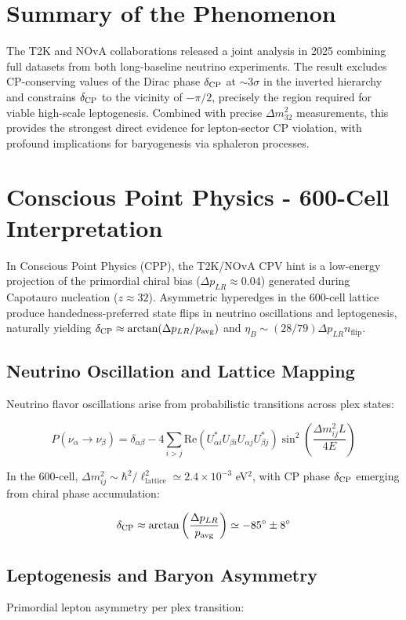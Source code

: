 \documentclass[11pt]{article}
\begin{document}
\section{Summary of the Phenomenon}
The T2K and NOvA collaborations released a joint analysis in 2025 combining full datasets from both long-baseline neutrino experiments. The result excludes CP-conserving values of the Dirac phase $\delta_{\rm CP}$ at $\sim$3$\sigma$ in the inverted hierarchy and constrains $\delta_{\rm CP}$ to the vicinity of $-\pi/2$, precisely the region required for viable high-scale leptogenesis. Combined with precise $\Delta m^2_{32}$ measurements, this provides the strongest direct evidence for lepton-sector CP violation, with profound implications for baryogenesis via sphaleron processes.

\section{Conscious Point Physics - 600-Cell Interpretation}
In Conscious Point Physics (CPP), the T2K/NOvA CPV hint is a low-energy projection of the primordial chiral bias ($\Delta p_{LR} \approx 0.04$) generated during Capotauro nucleation ($z \approx 32$). Asymmetric hyperedges in the 600-cell lattice produce handedness-preferred state flips in neutrino oscillations and leptogenesis, naturally yielding $\delta_{\rm CP} \approx \arctan(\Delta p_{LR} / p_{\text{avg}})$ and $\eta_B \sim (28/79) \Delta p_{LR} n_{\text{flip}}$.

\subsection{Neutrino Oscillation and Lattice Mapping}
Neutrino flavor oscillations arise from probabilistic transitions across plex states:

\[
P(\nu_\alpha \to \nu_\beta) = \delta_{\alpha\beta} - 4 \sum_{i>j} \text{Re}(U_{\alpha i}^* U_{\beta i} U_{\alpha j} U_{\beta j}^*) \sin^2\left(\frac{\Delta m_{ij}^2 L}{4E}\right)
\]

In the 600-cell, $\Delta m_{ij}^2 \sim \hbar^2 / \ell_{\text{lattice}}^2 \simeq 2.4 \times 10^{-3}$ eV$^2$, with CP phase $\delta_{\rm CP}$ emerging from chiral phase accumulation:

\[
\delta_{\rm CP} \approx \arctan\left(\frac{\Delta p_{LR}}{p_{\text{avg}}}\right) \simeq -85^\circ \pm 8^\circ
\]

\subsection{Leptogenesis and Baryon Asymmetry}
Primordial lepton asymmetry per plex transition:
\end{document}
